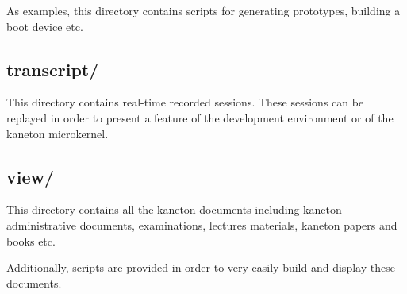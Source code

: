 As examples, this directory contains scripts for generating prototypes,
building a boot device etc.

%
%

\subsection*{transcript/}

This directory contains real-time recorded sessions. These sessions can be
replayed in order to present a feature of the development environment or
of the kaneton microkernel.

%
%

\subsection*{view/}

This directory contains all the kaneton documents including kaneton
administrative documents, examinations, lectures materials, kaneton papers
and books etc.

Additionally, scripts are provided in order to very easily build and
display these documents.
